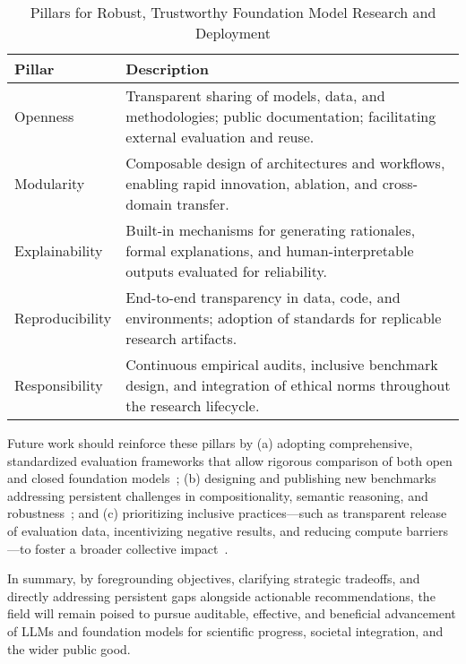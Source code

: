 \documentclass[sigconf]{acmart}
\begin{document}
\begin{table*}[htbp]
\centering
\caption{Pillars for Robust, Trustworthy Foundation Model Research and Deployment}
\label{tab;pillars_future}
\begin{adjustbox}{max width=\textwidth}
\begin{tabular}{ll}
\toprule
\textbf{Pillar} & \textbf{Description} \\
\midrule
Openness        & Transparent sharing of models, data, and methodologies; public documentation; facilitating external evaluation and reuse. \\
Modularity      & Composable design of architectures and workflows, enabling rapid innovation, ablation, and cross-domain transfer. \\
Explainability  & Built-in mechanisms for generating rationales, formal explanations, and human-interpretable outputs evaluated for reliability. \\
Reproducibility & End-to-end transparency in data, code, and environments; adoption of standards for replicable research artifacts. \\
Responsibility  & Continuous empirical audits, inclusive benchmark design, and integration of ethical norms throughout the research lifecycle. \\
\bottomrule
\end{tabular}
\end{adjustbox}
\end{table*}

Future work should reinforce these pillars by (a) adopting comprehensive, standardized evaluation frameworks that allow rigorous comparison of both open and closed foundation models~\cite{ref94,ref95,ref96,ref97,ref101,ref105}; (b) designing and publishing new benchmarks addressing persistent challenges in compositionality, semantic reasoning, and robustness~\cite{ref94,ref96,ref97,ref99,ref105}; and (c) prioritizing inclusive practices---such as transparent release of evaluation data, incentivizing negative results, and reducing compute barriers---to foster a broader collective impact~\cite{ref92,ref107,ref108}.

In summary, by foregrounding objectives, clarifying strategic tradeoffs, and directly addressing persistent gaps alongside actionable recommendations, the field will remain poised to pursue auditable, effective, and beneficial advancement of LLMs and foundation models for scientific progress, societal integration, and the wider public good.



\end{document}
